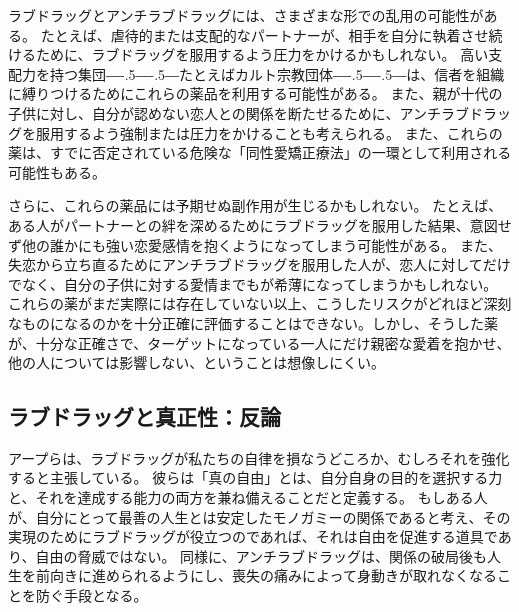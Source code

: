 \documentclass[paper=a4,book,openany]{jlreq}
\def\DDASH{―\kern-.5\zw―\kern-.5\zw―} %
\begin{document}
ラブドラッグとアンチラブドラッグには、さまざまな形での乱用の可能性がある。
たとえば、虐待的または支配的なパートナーが、相手を自分に執着させ続けるために、ラブドラッグを服用するよう圧力をかけるかもしれない。
高い支配力を持つ集団{\DDASH}たとえばカルト宗教団体{\DDASH}は、信者を組織に縛りつけるためにこれらの薬品を利用する可能性がある。
また、親が十代の子供に対し、自分が認めない恋人との関係を断たせるために、アンチラブドラッグを服用するよう強制または圧力をかけることも考えられる。
また、これらの薬は、すでに否定されている危険な「同性愛矯正療法」の一環として利用される可能性もある。

さらに、これらの薬品には予期せぬ副作用が生じるかもしれない。
たとえば、ある人がパートナーとの絆を深めるためにラブドラッグを服用した結果、意図せず他の誰かにも強い恋愛感情を抱くようになってしまう可能性がある。
また、失恋から立ち直るためにアンチラブドラッグを服用した人が、恋人に対してだけでなく、自分の子供に対する愛情までもが希薄になってしまうかもしれない。
これらの薬がまだ実際には存在していない以上、こうしたリスクがどれほど深刻なものになるのかを十分正確に評価することはできない。しかし、そうした薬が、十分な正確さで、ターゲットになっている一人にだけ親密な愛着を抱かせ、他の人については影響しない、ということは想像しにくい。


\subsection{ラブドラッグと真正性：反論}

アープらは、ラブドラッグが私たちの自律を損なうどころか、むしろそれを強化すると主張している。
彼らは「真の自由」とは、自分自身の目的を選択する力と、それを達成する能力の両方を兼ね備えることだと定義する。
もしある人が、自分にとって最善の人生とは安定したモノガミーの関係であると考え、その実現のためにラブドラッグが役立つのであれば、それは自由を促進する道具であり、自由の脅威ではない。
同様に、アンチラブドラッグは、関係の破局後も人生を前向きに進められるようにし、喪失の痛みによって身動きが取れなくなることを防ぐ手段となる。
\end{document}
